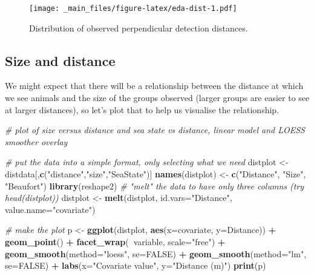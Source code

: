 \documentclass[]{book}
\newenvironment{Shaded}{\begin{snugshade}}{\end{snugshade}}
\newcommand{\KeywordTok}[1]{\textcolor[rgb]{0.13,0.29,0.53}{\textbf{#1}}}
\newcommand{\DataTypeTok}[1]{\textcolor[rgb]{0.13,0.29,0.53}{#1}}
\newcommand{\StringTok}[1]{\textcolor[rgb]{0.31,0.60,0.02}{#1}}
\newcommand{\CommentTok}[1]{\textcolor[rgb]{0.56,0.35,0.01}{\textit{#1}}}
\newcommand{\OtherTok}[1]{\textcolor[rgb]{0.56,0.35,0.01}{#1}}
\newcommand{\OperatorTok}[1]{\textcolor[rgb]{0.81,0.36,0.00}{\textbf{#1}}}
\newcommand{\NormalTok}[1]{#1}
\theoremstyle{definition}
\theoremstyle{definition}
\theoremstyle{remark}
\begin{document}
\begin{figure}
\centering
\texttt{[image: \_main\_files/figure-latex/eda-dist-1.pdf]}
\caption{\label{fig:eda-dist}Distribution of observed perpendicular
detection distances.}
\end{figure}

\subsection{Size and distance}\label{size-and-distance}

We might expect that there will be a relationship between the distance
at which we see animals and the size of the groups observed (larger
groups are easier to see at larger distances), so let's plot that to
help us visualise the relationship.

\begin{Shaded}
\begin{Highlighting}[]
\CommentTok{# plot of size versus distance and sea state vs distance, linear model and LOESS smoother overlay}

\CommentTok{# put the data into a simple format, only selecting what we need}
\NormalTok{distplot <-}\StringTok{ }\NormalTok{distdata[,}\KeywordTok{c}\NormalTok{(}\StringTok{"distance"}\NormalTok{,}\StringTok{"size"}\NormalTok{,}\StringTok{"SeaState"}\NormalTok{)]}
\KeywordTok{names}\NormalTok{(distplot) <-}\StringTok{ }\KeywordTok{c}\NormalTok{(}\StringTok{"Distance"}\NormalTok{, }\StringTok{"Size"}\NormalTok{, }\StringTok{"Beaufort"}\NormalTok{)}
\KeywordTok{library}\NormalTok{(reshape2)}
\CommentTok{# "melt" the data to have only three columns (try head(distplot))}
\NormalTok{distplot <-}\StringTok{ }\KeywordTok{melt}\NormalTok{(distplot, }\DataTypeTok{id.vars=}\StringTok{"Distance"}\NormalTok{, }\DataTypeTok{value.name=}\StringTok{"covariate"}\NormalTok{)}

\CommentTok{# make the plot}
\NormalTok{p <-}\StringTok{ }\KeywordTok{ggplot}\NormalTok{(distplot, }\KeywordTok{aes}\NormalTok{(}\DataTypeTok{x=}\NormalTok{covariate, }\DataTypeTok{y=}\NormalTok{Distance)) }\OperatorTok{+}
\StringTok{      }\KeywordTok{geom_point}\NormalTok{() }\OperatorTok{+}
\StringTok{      }\KeywordTok{facet_wrap}\NormalTok{(}\OperatorTok{~}\NormalTok{variable, }\DataTypeTok{scale=}\StringTok{"free"}\NormalTok{) }\OperatorTok{+}
\StringTok{      }\KeywordTok{geom_smooth}\NormalTok{(}\DataTypeTok{method=}\StringTok{"loess"}\NormalTok{, }\DataTypeTok{se=}\OtherTok{FALSE}\NormalTok{) }\OperatorTok{+}
\StringTok{      }\KeywordTok{geom_smooth}\NormalTok{(}\DataTypeTok{method=}\StringTok{"lm"}\NormalTok{, }\DataTypeTok{se=}\OtherTok{FALSE}\NormalTok{) }\OperatorTok{+}
\StringTok{      }\KeywordTok{labs}\NormalTok{(}\DataTypeTok{x=}\StringTok{"Covariate value"}\NormalTok{, }\DataTypeTok{y=}\StringTok{"Distance (m)"}\NormalTok{)}
\KeywordTok{print}\NormalTok{(p)}
\end{Highlighting}
\end{Shaded}
\end{document}
